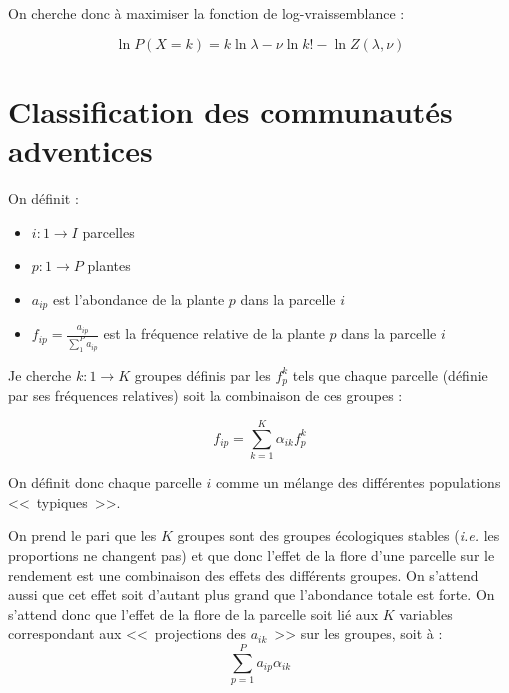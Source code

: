 \documentclass[a4paper, 12pt]{article}
\begin{document}
On cherche donc à maximiser la fonction de log-vraissemblance :

\[
  \ln P(X = k) = k\ln\lambda - \nu\ln k! - \ln Z(\lambda,\nu)
\]


\section{Classification des communautés adventices}

On définit :

\begin{itemize}
  \item $ i : 1 \to I $ parcelles
  \item $ p : 1 \to P $ plantes
  \item $ a_{ip} $ est l'abondance de la plante $p$ dans la parcelle $i$
  \item $f_{ip} = \frac{a_{ip}}{\sum_{1}^{P} a_{ip}}$ est la fréquence relative
    de la plante $p$ dans la parcelle $i$
\end{itemize}

Je cherche $ k: 1 \to K $ groupes définis par les $ f^{k}_{p} $ tels que chaque
parcelle (définie par ses fréquences relatives) soit la combinaison de ces
groupes :

\[
  f_{ip} = \sum_{k=1}^{K} \alpha _{ik}f_{p}^{k}
\]

On définit donc chaque parcelle $i$ comme un mélange des différentes populations
<<~typiques~>>.

On prend le pari que les $K$ groupes sont des groupes écologiques stables
(\textit{i.e.} les proportions ne changent pas) et que donc l'effet de la flore
d'une parcelle sur le rendement est une combinaison des effets des différents
groupes.
On s'attend aussi que cet effet soit d'autant plus grand que l'abondance totale
est forte.
On s'attend donc que l'effet de la flore de la parcelle soit lié aux $K$
variables correspondant aux <<~projections des $a_{ik}$~>> sur les groupes, soit
à :
\[
  \sum_{p=1}^{P} a_{ip} \alpha _{ik}
\]
\end{document}
